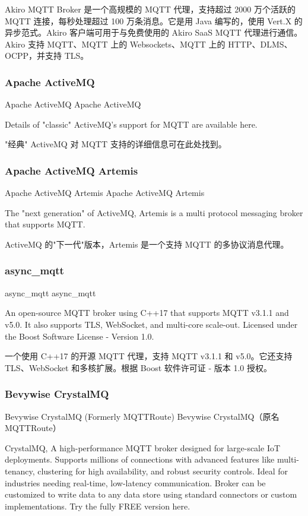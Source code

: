 \documentclass{ctexbook}
\begin{document}
Akiro MQTT Broker 是一个高规模的 MQTT 代理，支持超过 2000 万个活跃的 MQTT 连接，每秒处理超过 100 万条消息。它是用 Java 编写的，使用 Vert.X 的异步范式。Akiro 客户端可用于与免费使用的 Akiro SaaS MQTT 代理进行通信。Akiro 支持 MQTT、MQTT 上的 Websockets、MQTT 上的 HTTP、DLMS、OCPP，并支持 TLS。

\subsubsection{Apache ActiveMQ}
Apache ActiveMQ Apache ActiveMQ

Details of "classic" ActiveMQ's support for MQTT are available here.

"经典" ActiveMQ 对 MQTT 支持的详细信息可在此处找到。

\subsubsection{Apache ActiveMQ Artemis}
Apache ActiveMQ Artemis Apache ActiveMQ Artemis

The "next generation" of ActiveMQ, Artemis is a multi protocol messaging broker that supports MQTT.

ActiveMQ 的"下一代"版本，Artemis 是一个支持 MQTT 的多协议消息代理。

\subsubsection{async\_mqtt}
async\_mqtt async\_mqtt

An open-source MQTT broker using C++17 that supports MQTT v3.1.1 and v5.0. It also supports TLS, WebSocket, and multi-core scale-out. Licensed under the Boost Software License - Version 1.0.

一个使用 C++17 的开源 MQTT 代理，支持 MQTT v3.1.1 和 v5.0。它还支持 TLS、WebSocket 和多核扩展。根据 Boost 软件许可证 - 版本 1.0 授权。

\subsubsection{Bevywise CrystalMQ}
Bevywise CrystalMQ (Formerly MQTTRoute) Bevywise CrystalMQ（原名 MQTTRoute）

CrystalMQ, A high-performance MQTT broker designed for large-scale IoT deployments. Supports millions of connections with advanced features like multi-tenancy, clustering for high availability, and robust security controls. Ideal for industries needing real-time, low-latency communication. Broker can be customized to write data to any data store using standard connectors or custom implementations. Try the fully FREE version here.
\end{document}
